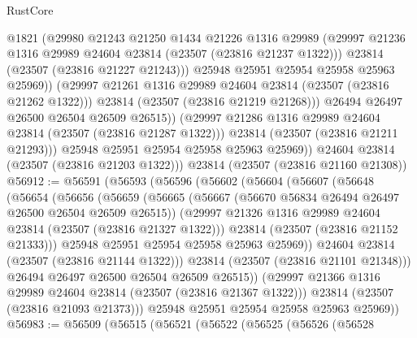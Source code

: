 \begin{lexlean}{RustCore}
\begin{coremodule}
                      @1821
                      (@29980
                        @21243
                        @21250
                        @1434
                        @21226
                        @1316
                        @29989
                        (@29997 @21236 @1316 @29989 @24604 @23814 (@23507 (@23816 @21237 @1322)))
                        @23814
                        (@23507 (@23816 @21227 @21243)))
                      @25948
                      @25951
                      @25954
                      @25958
                      @25963
                      @25969))
                  (@29997 @21261 @1316 @29989 @24604 @23814 (@23507 (@23816 @21262 @1322)))
                  @23814
                  (@23507 (@23816 @21219 @21268)))
                @26494
                @26497
                @26500
                @26504
                @26509
                @26515))
            (@29997 @21286 @1316 @29989 @24604 @23814 (@23507 (@23816 @21287 @1322)))
            @23814
            (@23507 (@23816 @21211 @21293)))
          @25948
          @25951
          @25954
          @25958
          @25963
          @25969))
      @24604
      @23814
      (@23507 (@23816 @21203 @1322)))
    @23814
    (@23507 (@23816 @21160 @21308))
@56912 := @56591
    (@56593
      (@56596
        (@56602
          (@56604
            (@56607
              (@56648
                (@56654
                  (@56656
                    (@56659
                      (@56665
                        (@56667 (@56670 @56834 @26494 @26497 @26500 @26504 @26509 @26515))
                        (@29997 @21326 @1316 @29989 @24604 @23814 (@23507 (@23816 @21327 @1322)))
                        @23814
                        (@23507 (@23816 @21152 @21333)))
                      @25948
                      @25951
                      @25954
                      @25958
                      @25963
                      @25969))
                  @24604
                  @23814
                  (@23507 (@23816 @21144 @1322)))
                @23814
                (@23507 (@23816 @21101 @21348)))
              @26494
              @26497
              @26500
              @26504
              @26509
              @26515))
          (@29997 @21366 @1316 @29989 @24604 @23814 (@23507 (@23816 @21367 @1322)))
          @23814
          (@23507 (@23816 @21093 @21373)))
        @25948
        @25951
        @25954
        @25958
        @25963
        @25969))
@56983 := @56509
    (@56515
      (@56521
        (@56522
          (@56525
            (@56526
              (@56528

\end{coremodule}
\end{lexlean}
